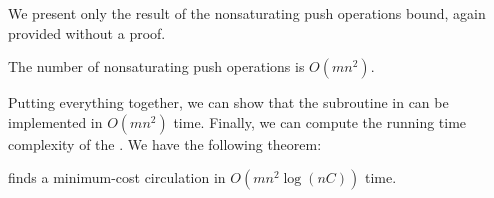 We present only the result of the nonsaturating push operations bound, again provided without a proof.
\begin{lemma}
    The number of nonsaturating push operations is $O(mn^2)$.
\end{lemma}

Putting everything together, we can show that the subroutine in  can be implemented in $O(mn^2)$ time.
Finally, we can compute the running time complexity of the . We have the following theorem:

\begin{theorem}
     finds a minimum-cost circulation in $O(mn^2 \log(nC))$ time.
\end{theorem}